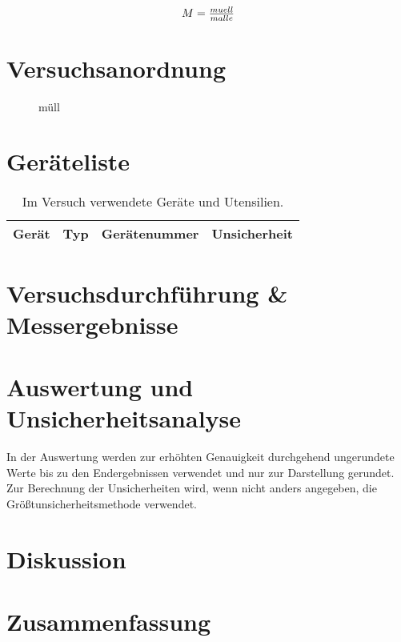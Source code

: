 \documentclass[12pt,a4paper,twoside]{article}
\begin{document}
    \begin{equation}
        \label{eq:Müll}
        \centerline{$M=\frac{muell}{malle}$}
    \end{equation}

\section{Versuchsanordnung} %

    \begin{figure}[H]
        \centering
        \caption{müll}
        \label{fig:müllbild}
    \end{figure}

\section{Geräteliste} %

    \begin{table}[H]
        \centering
        \caption{Im Versuch verwendete Geräte und Utensilien.}
        \label{tab:geraete}
        \begin{tabular}{| l | l | l | l |}
            \hline
            Gerät   & Typ   & Gerätenummer  & Unsicherheit \\
            \hline
        \end{tabular}
    \end{table}


\section{Versuchsdurchführung \& Messergebnisse} %


\section{Auswertung und Unsicherheitsanalyse} %

In der Auswertung werden zur erhöhten Genauigkeit durchgehend ungerundete Werte bis zu den Endergebnissen verwendet und nur zur Darstellung gerundet. \\
Zur Berechnung der Unsicherheiten wird, wenn nicht anders angegeben, die Größtunsicherheitsmethode verwendet.


\section{Diskussion} %


\section{Zusammenfassung} %


\printbibliography[heading=bibintoc]
\end{document}
